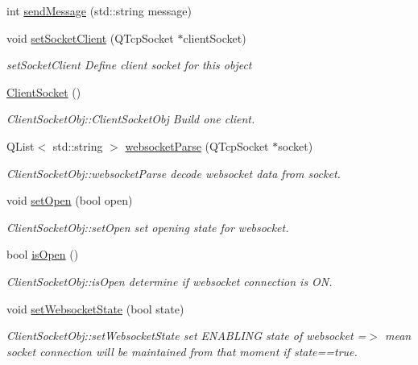 \begin{DoxyCompactItemize}
int \hyperlink{class_client_socket_ae2e6b6a4536c986b54d5db1902e11ce8}{send\-Message} (std\-::string message)
\item 
void \hyperlink{class_client_socket_af914375c58704f66d2819cac3a3cca67}{set\-Socket\-Client} (Q\-Tcp\-Socket $\ast$client\-Socket)
\begin{DoxyCompactList}\small\item\em set\-Socket\-Client Define client socket for this object \end{DoxyCompactList}\item 
\hypertarget{class_client_socket_aa452c26d330984ce23eb98fba8e59c6a}{\hyperlink{class_client_socket_aa452c26d330984ce23eb98fba8e59c6a}{Client\-Socket} ()}\label{class_client_socket_aa452c26d330984ce23eb98fba8e59c6a}

\begin{DoxyCompactList}\small\item\em Client\-Socket\-Obj\-::\-Client\-Socket\-Obj Build one client. \end{DoxyCompactList}\item 
Q\-List$<$ std\-::string $>$ \hyperlink{class_client_socket_aa9125ab7983520d0e536afef1be62c83}{websocket\-Parse} (Q\-Tcp\-Socket $\ast$socket)
\begin{DoxyCompactList}\small\item\em Client\-Socket\-Obj\-::websocket\-Parse decode websocket data from socket. \end{DoxyCompactList}\item 
void \hyperlink{class_client_socket_a5ec144ce9f5b71f11d861a5f94273bf2}{set\-Open} (bool open)
\begin{DoxyCompactList}\small\item\em Client\-Socket\-Obj\-::set\-Open set opening state for websocket. \end{DoxyCompactList}\item 
bool \hyperlink{class_client_socket_ab3747426831f271a9a0e54c5b44bddc7}{is\-Open} ()
\begin{DoxyCompactList}\small\item\em Client\-Socket\-Obj\-::is\-Open determine if websocket connection is O\-N. \end{DoxyCompactList}\item 
void \hyperlink{class_client_socket_a985fe4b2ab2ae12e4dbbd165580698ac}{set\-Websocket\-State} (bool state)
\begin{DoxyCompactList}\small\item\em Client\-Socket\-Obj\-::set\-Websocket\-State set E\-N\-A\-B\-L\-I\-N\-G state of websocket =$>$ mean socket connection will be maintained from that moment if state==true. \end{DoxyCompactList}\item 

\end{DoxyCompactItemize}
